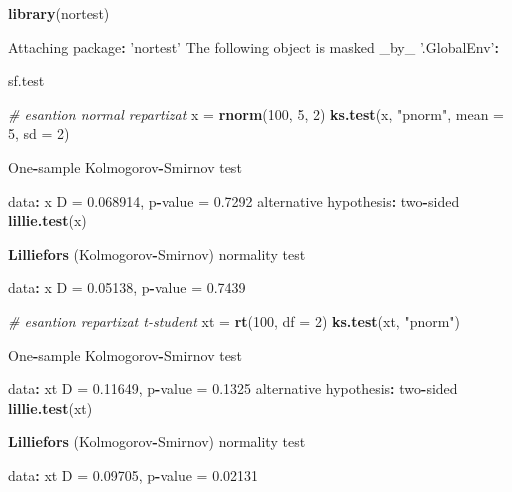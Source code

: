 \documentclass[]{article}
\newenvironment{Shaded}{\begin{snugshade}}{\end{snugshade}}
\newcommand{\KeywordTok}[1]{\textcolor[rgb]{0.13,0.29,0.53}{\textbf{#1}}}
\newcommand{\DataTypeTok}[1]{\textcolor[rgb]{0.13,0.29,0.53}{#1}}
\newcommand{\DecValTok}[1]{\textcolor[rgb]{0.00,0.00,0.81}{#1}}
\newcommand{\FloatTok}[1]{\textcolor[rgb]{0.00,0.00,0.81}{#1}}
\newcommand{\StringTok}[1]{\textcolor[rgb]{0.31,0.60,0.02}{#1}}
\newcommand{\CommentTok}[1]{\textcolor[rgb]{0.56,0.35,0.01}{\textit{#1}}}
\newcommand{\OperatorTok}[1]{\textcolor[rgb]{0.81,0.36,0.00}{\textbf{#1}}}
\newcommand{\NormalTok}[1]{#1}
\begin{document}
\begin{Shaded}
\begin{Highlighting}[]
\KeywordTok{library}\NormalTok{(nortest)}

\NormalTok{Attaching package}\OperatorTok{:}\StringTok{ 'nortest'}
\NormalTok{The following object is masked _by_ }\StringTok{'.GlobalEnv'}\OperatorTok{:}

\StringTok{    }\NormalTok{sf.test}

\CommentTok{# esantion normal repartizat }
\NormalTok{x =}\StringTok{ }\KeywordTok{rnorm}\NormalTok{(}\DecValTok{100}\NormalTok{, }\DecValTok{5}\NormalTok{, }\DecValTok{2}\NormalTok{)}
\KeywordTok{ks.test}\NormalTok{(x, }\StringTok{"pnorm"}\NormalTok{, }\DataTypeTok{mean =} \DecValTok{5}\NormalTok{, }\DataTypeTok{sd =} \DecValTok{2}\NormalTok{)}

\NormalTok{    One}\OperatorTok{-}\NormalTok{sample Kolmogorov}\OperatorTok{-}\NormalTok{Smirnov test}

\NormalTok{data}\OperatorTok{:}\StringTok{  }\NormalTok{x}
\NormalTok{D =}\StringTok{ }\FloatTok{0.068914}\NormalTok{, p}\OperatorTok{-}\NormalTok{value =}\StringTok{ }\FloatTok{0.7292}
\NormalTok{alternative hypothesis}\OperatorTok{:}\StringTok{ }\NormalTok{two}\OperatorTok{-}\NormalTok{sided}
\KeywordTok{lillie.test}\NormalTok{(x)}

    \KeywordTok{Lilliefors}\NormalTok{ (Kolmogorov}\OperatorTok{-}\NormalTok{Smirnov) normality test}

\NormalTok{data}\OperatorTok{:}\StringTok{  }\NormalTok{x}
\NormalTok{D =}\StringTok{ }\FloatTok{0.05138}\NormalTok{, p}\OperatorTok{-}\NormalTok{value =}\StringTok{ }\FloatTok{0.7439}

\CommentTok{# esantion repartizat t-student}
\NormalTok{xt =}\StringTok{ }\KeywordTok{rt}\NormalTok{(}\DecValTok{100}\NormalTok{, }\DataTypeTok{df =} \DecValTok{2}\NormalTok{)}
\KeywordTok{ks.test}\NormalTok{(xt, }\StringTok{"pnorm"}\NormalTok{)}

\NormalTok{    One}\OperatorTok{-}\NormalTok{sample Kolmogorov}\OperatorTok{-}\NormalTok{Smirnov test}

\NormalTok{data}\OperatorTok{:}\StringTok{  }\NormalTok{xt}
\NormalTok{D =}\StringTok{ }\FloatTok{0.11649}\NormalTok{, p}\OperatorTok{-}\NormalTok{value =}\StringTok{ }\FloatTok{0.1325}
\NormalTok{alternative hypothesis}\OperatorTok{:}\StringTok{ }\NormalTok{two}\OperatorTok{-}\NormalTok{sided}
\KeywordTok{lillie.test}\NormalTok{(xt)}

    \KeywordTok{Lilliefors}\NormalTok{ (Kolmogorov}\OperatorTok{-}\NormalTok{Smirnov) normality test}

\NormalTok{data}\OperatorTok{:}\StringTok{  }\NormalTok{xt}
\NormalTok{D =}\StringTok{ }\FloatTok{0.09705}\NormalTok{, p}\OperatorTok{-}\NormalTok{value =}\StringTok{ }\FloatTok{0.02131}
\end{Highlighting}
\end{Shaded}
\end{document}
